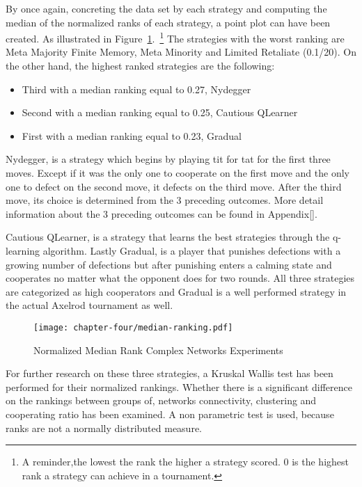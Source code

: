 By once again, concreting the data set by each strategy and computing the median
of the normalized ranks of each strategy, a point plot can have been created.
As illustrated in Figure~\ref{ranking-second-gen}.~\footnote{A reminder,the
	lowest the rank the higher a strategy scored. 0 is the highest rank a strategy
can achieve in a tournament.}
The strategies with the worst ranking are Meta Majority Finite Memory, Meta
Minority and Limited Retaliate (0.1/20). On the other hand, the highest ranked
strategies are the following:

\begin{itemize}
	\item Third with a median ranking equal to 0.27, Nydegger
	\item Second with a median ranking equal to 0.25, Cautious QLearner
	\item First with a median ranking equal to 0.23, Gradual
\end{itemize}

Nydegger, is a strategy which begins by playing  tit for tat for the first
three moves. Except if it was the only one to cooperate on the first move and
the only one to defect on the second move, it defects on the third move.
After the third move,  its choice is determined from the 3 preceding outcomes.
More detail information about the 3 preceding outcomes can be found in Appendix[].

Cautious QLearner, is a strategy that learns the best strategies through the
q-learning algorithm. Lastly Gradual, is a player that punishes defections with
a growing number of defections but after punishing enters a calming state and
cooperates no matter what the opponent does for two rounds. All three strategies
are categorized as high cooperators and Gradual is a well performed strategy
in the actual Axelrod tournament as well.

\begin{figure}[!hbtp]
	\texttt{[image: chapter-four/median-ranking.pdf]}
	\caption{Normalized Median Rank Complex Networks Experiments}
	\label{ranking-second-gen}
\end{figure}

For further research on these three strategies, a Kruskal Wallis test
has been performed for their normalized rankings. Whether there is a significant
difference on the rankings between groups of, networks connectivity, clustering
and cooperating ratio has been examined. A non parametric test is used, because
ranks are not a normally distributed measure.

